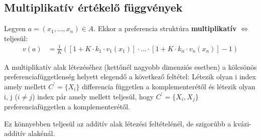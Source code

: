 \documentclass[a4paper,12pt]{article}
\begin{document}
\subsection{Multiplikatív értékelő függvények}
Legyen $a=(x_1, ... , x_n) \in A$. Ekkor a preferencia struktúra \textbf{multiplikatív} $\Leftrightarrow$ teljesül:
\begin{equation}
\begin{split}
v(a)  & = \frac{1}{K}([1+K\cdot k_{1}\cdot  v_1(x_1)]\cdot ...\cdot [1+K\cdot k_{n}\cdot  v_n(x_n)] - 1)
\end{split}
\end{equation}

A multiplikatív alak létezéséhez (kettőnél nagyobb dimenziós esetben) a kölcsönös preferenciafüggetlenség helyett elegendő a következő feltétel:
Létezik olyan i index amely mellett $ C^{'}=\{X_i\}$ differencia független a komplementerétől és létezik olyan i, j ($i \neq j$) index pár amely mellett teljesül, hogy $ C^{'}=\{X_i, X_j\}$ preferenciafüggetlen a komplementerétől. 

Ez könnyebben teljesül az additív alak létezési feltételénél, de szigorúbb a kvázi-additív alakénál.
\end{document}
